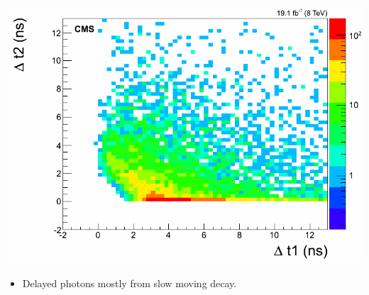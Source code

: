 \documentclass{beamer}
\begin{document}
\begin{frame}
  \begin{minipage}[b]{0.85\paperwidth}
   \begin{tcolorbox}[colback=UNL@Cream!5,colframe=UNL@Cream!70,title=\textcolor{UMN@Maroon}{\textbf{ }}]
    \includegraphics[height=0.30\linewidth, width=\linewidth]{THESISPLOTS/dt1_dt2_late.png}
    \begin{itemize}
     \item Delayed photons mostly from slow moving decay.    
    \end{itemize}
    \end{tcolorbox}
  \end{minipage}
\end{frame}
\end{document}
